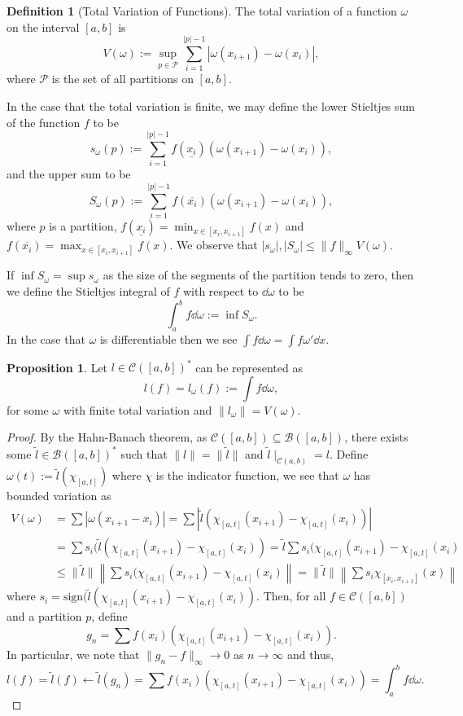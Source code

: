 \documentclass[]{article}
\theoremstyle{definition}
\theoremstyle{definition}
\newtheorem{definition}{Definition}[section]
\newtheorem{proposition}{Proposition}[section]
\begin{document}
\begin{definition}[Total Variation of Functions]
  The total variation of a function \(\omega\) on the interval \([a, b]\) is 
  \[V(\omega) := \sup_{p \in \mathcal{P}}
    \sum_{i = 1}^{|p| - 1} |\omega(x_{i + 1}) - \omega(x_i)|,\]
  where \(\mathcal{P}\) is the set of all partitions on \([a, b]\).
\end{definition}

In the case that the total variation is finite, we may define the lower 
Stieltjes sum of the function \(f\) to be 
\[s_{\omega}(p) := \sum_{i = 1}^{|p| - 1} 
  f(\underline{x_i})(\omega(x_{i + 1}) - \omega(x_i)),\]
and the upper sum to be 
\[S_{\omega}(p) := \sum_{i = 1}^{|p| - 1} 
  f(\overline{x_i})(\omega(x_{i + 1}) - \omega(x_i)),\]
where \(p\) is a partition, 
\(f(\underline{x_i}) = \min_{x \in [x_i, x_{i + 1}]} f(x)\) and
\(f(\overline{x_i}) = \max_{x \in [x_i, x_{i + 1}]} f(x)\).
We observe that 
\(|s_{\omega}|, |S_{\omega}| \le \|f\|_\infty V(\omega)\).

If \(\inf S_{\omega} = \sup s_\omega\) as the size of the segments of 
the partition tends to zero, then we define the Stieltjes integral of 
\(f\) with respect to \(\dd \omega\) to be 
\[\int_a^b f \dd \omega := \inf S_\omega.\]
In the case that \(\omega\) is differentiable then we see 
\(\int f \dd\omega = \int f \omega' \dd x\).

\begin{proposition}
  Let \(l \in \mathcal{C}([a, b])^*\) can be represented as 
  \[l(f) = l_\omega(f) := \int f \dd \omega,\]
  for some \(\omega\) with finite total variation and 
  \(\|l_\omega\| = V(\omega)\).
\end{proposition}
\begin{proof}
  By the Hahn-Banach theorem, as \(\mathcal{C}([a, b]) \subseteq 
  \mathcal{B}([a, b])\), there exists some \(\tilde l \in \mathcal{B}([a, b])^*\) 
  such that \(\|l\| = \|\tilde l\|\) and \(\tilde l\mid_{\mathcal{C}(a, b)} = l\).
  Define \(\omega(t) := \tilde l(\chi_{[a, t]})\) where \(\chi\) is the indicator 
  function, we see that \(\omega\) has bounded variation as 
  \[\begin{split}
    V(\omega) & = \sum |\omega(x_{i + 1} - x_i)| 
      = \sum |\tilde l(\chi_{[a, t]}(x_{i + 1}) - \chi_{[a, t]}(x_i))|\\
    & = \sum s_i (\tilde l(\chi_{[a, t]}(x_{i + 1}) - \chi_{[a, t]}(x_i))
      = \tilde l \sum s_i(\chi_{[a, t]}(x_{i + 1}) - \chi_{[a, t]}(x_i)\\
    & \le \|\tilde  l\| \left\|\sum s_i(\chi_{[a, t]}(x_{i + 1}) - \chi_{[a, t]}(x_i)\right\|
      = \|\tilde  l\| \left\|\sum s_i \chi_{[x_i, x_{i+1}]}(x)\right\|
  \end{split}
  \]
  where \(s_i = \text{sign}(\tilde l(\chi_{[a, t]}(x_{i + 1}) - \chi_{[a, t]}(x_i))\).
  Then, for all \(f \in \mathcal{C}([a, b])\) and a partition \(p\), define 
  \[g_n = \sum f(x_i) (\chi_{[a, t]}(x_{i + 1}) - \chi_{[a, t]}(x_i)).\]
  In particular, we note that \(\|g_n - f\|_\infty \to 0\) as \(n \to \infty\) 
  and thus, 
  \[l(f) = \tilde l(f) \leftarrow \tilde l(g_n) = 
  \sum f(x_i) (\chi_{[a, t]}(x_{i + 1}) - \chi_{[a, t]}(x_i)) = \int_a^b f \dd \omega. \]
\end{proof}
\end{document}

